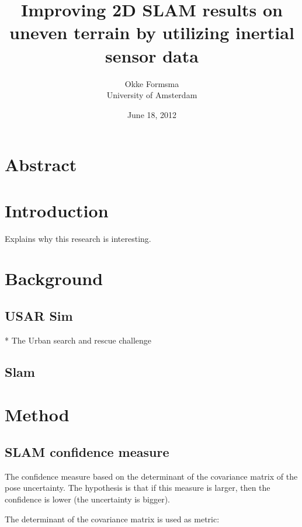 \documentclass[a4paper, 10pt]{report}
\title{Improving 2D SLAM results on uneven terrain by utilizing inertial sensor data}
\date{June 18, 2012}
\author{Okke Formsma\\ University of Amsterdam}
\begin{document}
\maketitle


\chapter*{Abstract}


%

\tableofcontents
{}

\chapter{Introduction}
\label{chapter:introduction}
Explains why this research is interesting.



\chapter{Background}
\section{USAR Sim}
* The Urban search and rescue challenge

\section{Slam}


\chapter{Method}
\section{SLAM confidence measure}
The confidence measure based on the determinant of the covariance matrix of the pose uncertainty. The hypothesis is that if this measure is larger, then the confidence is lower (the uncertainty is bigger).

The determinant of the covariance matrix is used as metric:
\end{document}
